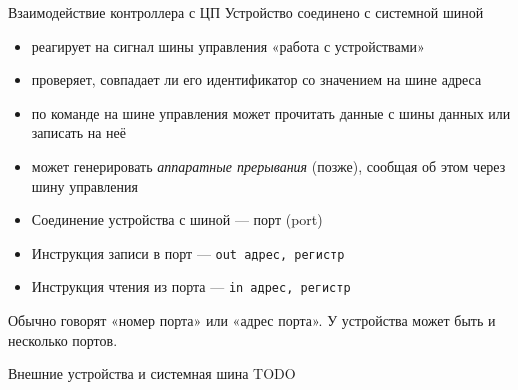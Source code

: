 \documentclass[xetex,aspectratio=43]{beamer}
\begin{document}
\begin{frame}[fragile]{Взаимодействие контроллера с ЦП}
	Устройство соединено с системной шиной

	\begin{itemize}
		\tightlist
		\item
		реагирует на сигнал шины управления «работа с устройствами»
		\item
		проверяет, совпадает ли его идентификатор со значением на шине адреса
		\item
		по команде на шине управления может прочитать данные с шины данных или записать на неё
		\item
		может генерировать \emph{аппаратные прерывания} (позже), сообщая об этом через шину управления
	\end{itemize}


	\begin{itemize}
		\tightlist
		\item
		Соединение устройства с шиной --- порт (port)
		\item
		Инструкция записи в порт --- \texttt{out\ адрес,\ регистр}
		\item
		Инструкция чтения из порта --- \texttt{in\ адрес,\ регистр}
	\end{itemize}


	Обычно говорят «номер порта» или «адрес порта». У устройства может быть
	и несколько портов.
\end{frame}

\begin{frame}{Внешние устройства и системная шина}
	TODO
\end{frame}
\end{document}
